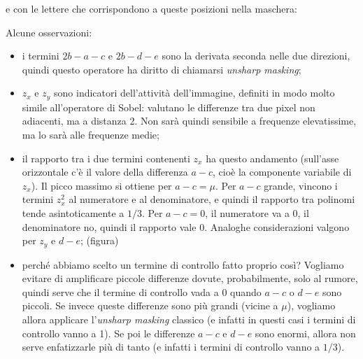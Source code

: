 \documentclass[a4paper,11pt]{article}
\begin{document}
e con le lettere che corrispondono a queste posizioni nella maschera:
\begin{figure}[h!]
\centering
{}
\end{figure}
\par
Alcune osservazioni:
\begin{itemize}
    \item i termini $2b-a-c$ e $2b-d-e$ sono la derivata seconda nelle due direzioni, quindi questo operatore ha diritto di chiamarsi \textit{unsharp masking};
    \item $z_x$ e $z_y$ sono indicatori dell'attività dell'immagine, definiti in modo molto simile all'operatore di Sobel: valutano le differenze tra due
    pixel non adiacenti, ma a distanza 2. Non sarà quindi sensibile a frequenze elevatissime, ma lo sarà alle frequenze medie;
    \item il rapporto tra i due termini contenenti $z_x$ ha questo andamento (sull'asse orizzontale c'è il valore della differenza $a-c$, cioè la
    componente variabile di $z_x$). Il picco massimo si ottiene per $a-c = \mu$. Per $a-c$ grande, vincono i termini $z_x^2$ al numeratore e al denominatore,
    e quindi il rapporto tra polinomi tende asintoticamente a $1/3$. Per $a-c = 0$, il numeratore va a 0, il denominatore no, quindi il rapporto vale 0.
    Analoghe considerazioni valgono per $z_y$ e $d-e$;
    (figura)
    \item perché abbiamo scelto un termine di controllo fatto proprio così? Vogliamo evitare di amplificare piccole differenze dovute, probabilmente,
    solo al rumore, quindi serve che il termine di controllo vada a 0 quando $a-c$ o $d-e$ sono piccoli. Se invece queste differenze sono più grandi (vicine
    a $\mu$), vogliamo allora applicare l'\textit{unsharp masking} classico (e infatti in questi casi i termini di controllo vanno a 1). Se poi le
    differenze $a-c$ e $d-e$ sono enormi, allora non serve enfatizzarle più di tanto (e infatti i termini di controllo vanno a $1/3$).
\end{itemize}
\end{document}
